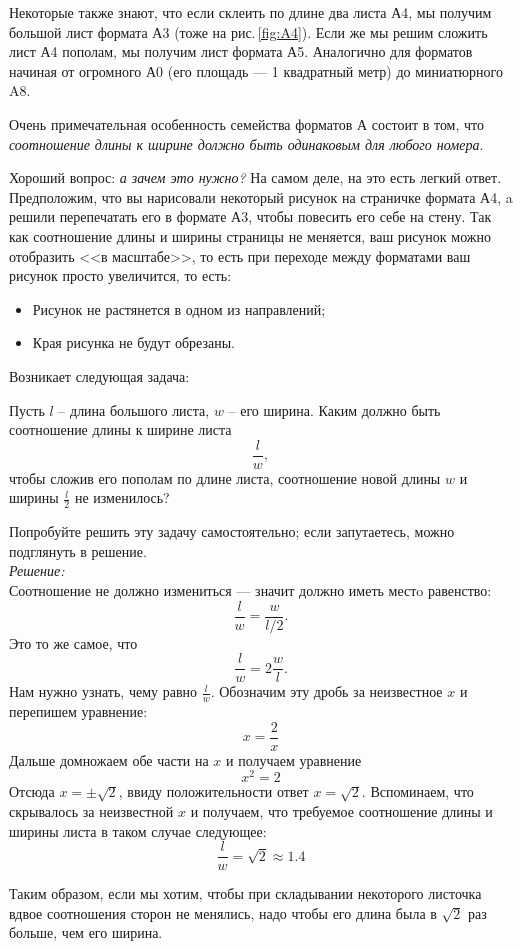 \documentclass[11pt,fleqn]{book} %
\begin{document}
Некоторые также знают, что если склеить по длине два листа А4, мы получим большой лист формата А3 (тоже на рис.\,\ref{fig:A4}). Если же мы решим сложить лист А4 пополам, мы получим лист формата А5. Аналогично для форматов начиная от огромного А0 (его площадь --- 1 квадратный метр) до миниатюрного A8.

Очень примечательная особенность семейства форматов А состоит в том, что \textit{соотношение длины к ширине должно быть одинаковым для любого номера}. 

Хороший вопрос: \textit{а зачем это нужно?} На самом деле, на это есть легкий ответ. Предположим, что вы нарисовали некоторый рисунок на страничке формата А4, a решили перепечатать его в формате А3, чтобы повесить его себе на стену. Так как соотношение длины и ширины страницы не меняется, ваш рисунок можно отобразить <<в масштабе>>, то есть при переходе между форматами ваш рисунок просто увеличится, то есть:

\begin{itemize}
 \item Рисунок не растянется в одном из направлений;
 \item Края рисунка не будут обрезаны.
 \end{itemize} 

Возникает следующая задача:

\begin{problem}
Пусть $l$ -- длина большого листа, $w$ -- его ширина. Каким должно быть соотношение длины к ширине листа $$\frac{l}{w},$$ чтобы сложив его пополам по длине листа, соотношение новой длины $w$ и ширины $\frac{l}{2}$ не изменилось?
\end{problem}
Попробуйте решить эту задачу самостоятельно; если запутаетесь, можно подглянуть в решение.
~\\ \textit{Решение:} ~\\
Соотношение не должно измениться --- значит должно иметь местo равенство:
$$\frac{l}{w} = \frac{w}{l/2}.$$
Это то же самое, что
$$\frac{l}{w} = 2\frac{w}{l}.$$
Нам нужно узнать, чему равно $\frac{l}{w}$. Обозначим эту дробь за неизвестное $x$ и перепишем уравнение: $$x = \frac{2}{x}$$ 
Дальше домножаем обе части на $x$ и получаем уравнение
$$x^2 = 2$$
Отсюда $x =\pm \sqrt{2}$, ввиду положительности ответ $x = \sqrt{2}$. Вспоминаем, что скрывалось за неизвестной $x$ и получаем, что требуемое соотношение длины и ширины листа в таком случае следующее:
$$\frac{l}{w} = \sqrt{2} \approx 1.4$$

Таким образом, если мы хотим, чтобы при складывании некоторого листочка вдвое соотношения сторон не менялись, надо чтобы его длина была в $\sqrt{2}$ раз больше, чем его ширина.
\end{document}
